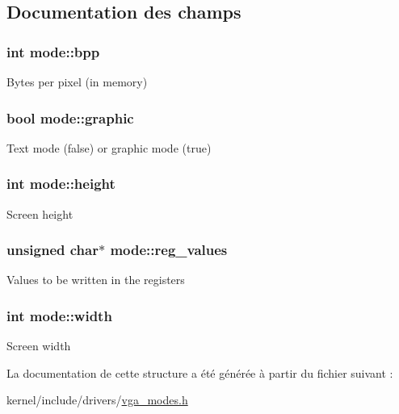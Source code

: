\subsection{\-Documentation des champs}
\hypertarget{structmode_a5ca924aaa8f33c270e7896095df93c64}{
\subsubsection[{bpp}]{\setlength{\rightskip}{0pt plus 5cm}int {\bf mode\-::bpp}}}\label{structmode_a5ca924aaa8f33c270e7896095df93c64}
\-Bytes per pixel (in memory) \hypertarget{structmode_a04810864c94405d05fdab5f4467a4db3}{
\subsubsection[{graphic}]{\setlength{\rightskip}{0pt plus 5cm}bool {\bf mode\-::graphic}}}\label{structmode_a04810864c94405d05fdab5f4467a4db3}
\-Text mode (false) or graphic mode (true) \hypertarget{structmode_a5e0e1e7b517ffe3532d75bda4b47b2c4}{
\subsubsection[{height}]{\setlength{\rightskip}{0pt plus 5cm}int {\bf mode\-::height}}}\label{structmode_a5e0e1e7b517ffe3532d75bda4b47b2c4}
\-Screen height \hypertarget{structmode_a704a184dc9d562c705d1feeb5be8788b}{
\subsubsection[{reg\-\_\-values}]{\setlength{\rightskip}{0pt plus 5cm}unsigned char$\ast$ {\bf mode\-::reg\-\_\-values}}}\label{structmode_a704a184dc9d562c705d1feeb5be8788b}
\-Values to be written in the registers \hypertarget{structmode_ae3caae9e51730e3fc85ab1f7c9bfce89}{
\subsubsection[{width}]{\setlength{\rightskip}{0pt plus 5cm}int {\bf mode\-::width}}}\label{structmode_ae3caae9e51730e3fc85ab1f7c9bfce89}
\-Screen width 

\-La documentation de cette structure a été générée à partir du fichier suivant \-:\begin{DoxyCompactItemize}
\item 
kernel/include/drivers/\hyperlink{vga__modes_8h}{vga\-\_\-modes.\-h}\end{DoxyCompactItemize}
